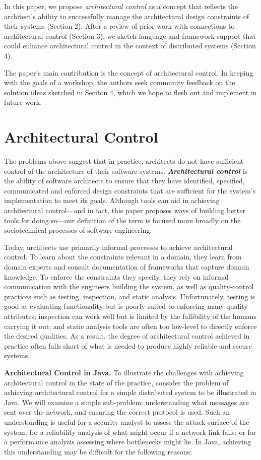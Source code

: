 \documentclass[runningheads]{llncs}
\newcommand{\minisec}[1]{\vspace{2ex}\noindent\textbf{#1}}
\begin{document}
\begin{sloppypar}
In this paper, we propose \emph{architectural control} as a concept that reflects the architect's ability to successfully manage the architectural design constraints of their systems (Section 2).  After a review of prior work with connections to architectural control (Section 3), we sketch language and framework support that could enhance architectural control in the context of distributed systems (Section 4).

The paper's main contribution is the concept of architectural control.  In keeping with the goals of a workshop, the authors seek community feedback on the solution ideas sketched in Seciton 4, which we hope to flesh out and implement in future work.


\section{Architectural Control}

The problems above suggest that in practice, architects do not have sufficient control of the architecture of their software systems.  \emph{\textbf{Architectural control}} is the ability of software architects to ensure that they have identified, specified, communicated and enforced design constraints that are sufficient for the system's implementation to meet its goals.  Although tools can aid in achieving architectural control---and in fact, this paper proposes ways of building better tools for doing so---our definition of the term is focused more broadly on the sociotechnical processes of software engineering.

Today, architects use primarily informal processes to achieve architectural control.  To learn about the constraints relevant in a domain, they learn from domain experts and consult documentation of frameworks that capture domain knowledge.  To enforce the constraints they specify, they rely on informal communication with the engineers building the system, as well as quality-control practices such as testing, inspection, and static analysis.  Unfortunately, testing is good at evaluating functionality but is poorly suited to enforcing many quality attributes; inspection can work well but is limited by the fallibility of the humans carrying it out; and static analysis tools are often too low-level to directly enforce the desired qualities.  As a result, the degree of architectural control achieved in practice often falls short of what is needed to produce highly reliable and secure systems.


\minisec{Architectural Control in Java.}  To illustrate the challenges with achieving architectural control in the state of the practice, consider the problem of achieving architectural control for a simple distributed system to be illustrated in Java.  We will examine a simple sub-problem: understanding what messages are sent over the network, and ensuring the correct protocol is used.  Such an understanding is useful for a security analyst to assess the attack surface of the system; for a reliability analysis of what might occur if a network link fails; or for a performance analysis assessing where bottlenecks might lie.  In Java, achieving this understanding may be difficult for the following reasons:


\end{sloppypar}
\end{document}
